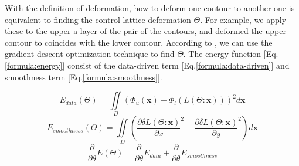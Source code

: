 \documentclass[3p,times]{elsarticle}
\begin{document}
With the definition of deformation, how to deform one contour to
another one is equivalent to finding the control lattice deformation
$\Theta$. For example, we apply these to the upper a layer of the
pair of the contours, and deformed the upper contour to  coincides with
the lower contour. According to \cite{huang_shape_2006}, we can use
the gradient descent optimization technique to find $\Theta$. The
energy function [Eq.\ref{formula:energy}] consist of the data-driven term
[Eq.\ref{formula:data-driven}] and smoothness term [Eq.\ref{formula:smoothness}].

\begin{equation}
\label{formula:data-driven}
E_{data}(\Theta)=\iint\limits_D(\Phi_{u}(\mathbf{x})-\Phi_{l}(L(\Theta:\mathbf{x})))^2d\mathbf{x}
\end{equation}
\begin{equation}
\label{formula:smoothness}
E_{smoothness}(\Theta)=\iint\limits_D\left( \frac{\partial\delta L(\Theta:\mathbf{x})}{\partial x}^2+\frac{\partial\delta L(
\Theta:\mathbf{x})}{\partial y}^2\right) d\mathbf{x}
\end{equation}
\begin{equation}
\label{formula:energy}
\frac{\partial}{\partial \theta} E(\Theta)=\frac{\partial
 }{\partial \theta} E_{data}+\frac{\partial}{\partial \theta} E_{smoothness}
\end{equation}
\end{document}
